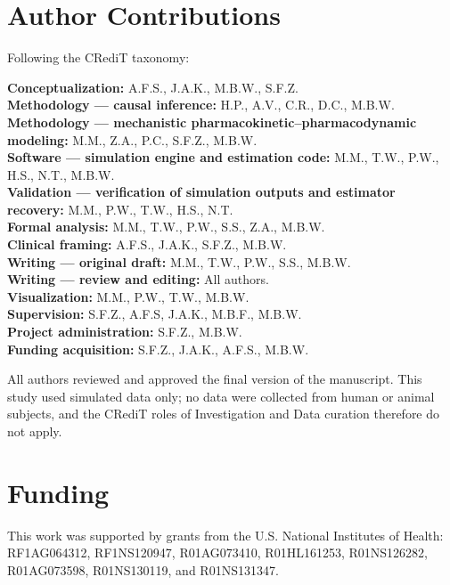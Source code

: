
\section*{Author Contributions}

Following the CRediT taxonomy:

\noindent\textbf{Conceptualization:} A.F.S., J.A.K., M.B.W., S.F.Z.\\
\textbf{Methodology --- causal inference:} H.P., A.V., C.R., D.C., M.B.W.\\
\textbf{Methodology --- mechanistic pharmacokinetic--pharmacodynamic modeling:} M.M., Z.A., P.C., S.F.Z., M.B.W.\\
\textbf{Software --- simulation engine and estimation code:} M.M., T.W., P.W., H.S., N.T., M.B.W.\\
\textbf{Validation --- verification of simulation outputs and estimator recovery:} M.M., P.W., T.W., H.S., N.T.\\
\textbf{Formal analysis:} M.M., T.W., P.W., S.S., Z.A., M.B.W.\\
\textbf{Clinical framing:} A.F.S., J.A.K., S.F.Z., M.B.W.\\
\textbf{Writing --- original draft:} M.M., T.W., P.W., S.S., M.B.W.\\
\textbf{Writing --- review and editing:} All authors.\\
\textbf{Visualization:} M.M., P.W., T.W., M.B.W.\\
\textbf{Supervision:} S.F.Z., A.F.S, J.A.K., M.B.F., M.B.W.\\
\textbf{Project administration:} S.F.Z., M.B.W.\\
\textbf{Funding acquisition:} S.F.Z., J.A.K., A.F.S., M.B.W.

\noindent All authors reviewed and approved the final version of the manuscript. This study used
simulated data only; no data were collected from human or animal subjects, and the CRediT roles of
Investigation and Data curation therefore do not apply.

\section*{Funding}

This work was supported by grants from the U.S. National Institutes of Health:
RF1AG064312, RF1NS120947, R01AG073410, R01HL161253, R01NS126282, R01AG073598,
R01NS130119, and R01NS131347.

